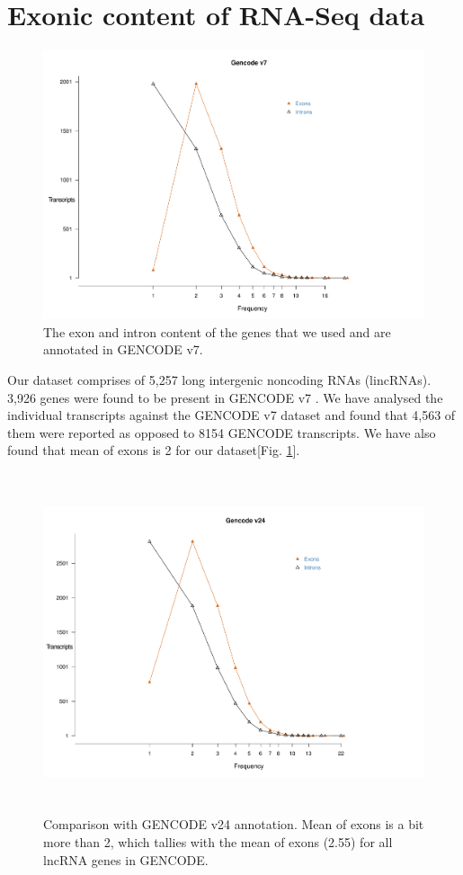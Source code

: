 \documentclass[ncrna,article,submit,moreauthors,pdftex,10pt,a4paper]{mdpi}
\begin{document}
\section{Exonic content of RNA-Seq data}
 \begin{figure}[h]
  \centering
  \includegraphics[height = 10 cm, width=\linewidth]{Gencode_v7_replot.pdf}
  \caption{The exon and intron content of the genes that we used and are annotated in GENCODE v7.}
  \label{f1}
 \end{figure}

Our dataset comprises of 5,257 long intergenic noncoding RNAs (lincRNAs). 3,926 genes were found to be present in GENCODE v7 \cite{harrow2012}. We have analysed the individual transcripts against the GENCODE v7 dataset and found that 4,563 of them were reported as opposed to 8154 GENCODE transcripts. We have also found that mean of exons is 2 for our dataset[Fig. \ref{f1}].

 \begin{figure}[h]
  \centering
  \includegraphics[height = 10cm, width=\linewidth]{Gencode_v24_replot.pdf}
  \caption{Comparison with GENCODE v24 annotation. Mean of exons is a bit more than 2, which tallies with the mean of exons (2.55) for all lncRNA genes in GENCODE.}
  \label{f2} 
 \end{figure}
 
\end{document}
